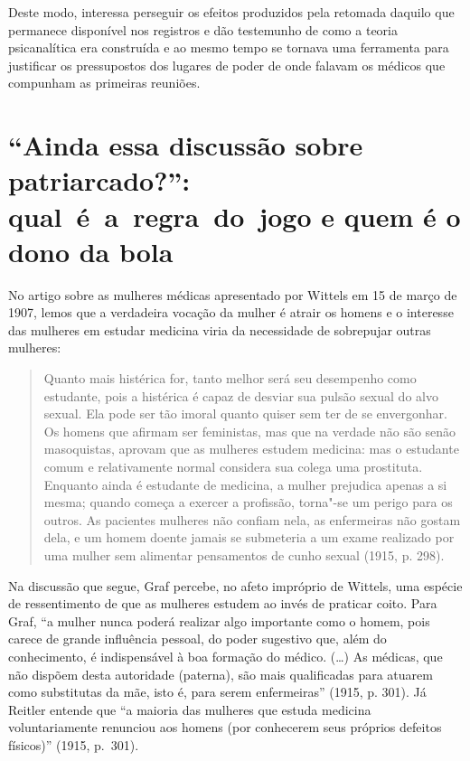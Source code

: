 Deste modo, interessa perseguir os efeitos produzidos pela retomada
daquilo que permanece disponível nos registros e dão testemunho de como
a teoria psicanalítica era construída e ao mesmo tempo se tornava uma
ferramenta para justificar os pressupostos dos lugares de poder de onde
falavam os médicos que compunham as primeiras reuniões.

\section{``Ainda essa discussão sobre patriarcado?'': qual~é~a~regra~do~jogo
e quem é o dono da bola}

No artigo sobre as mulheres médicas apresentado por Wittels em 15 de
março de 1907, lemos que a verdadeira vocação da mulher é atrair os
homens e o interesse das mulheres em estudar medicina viria da
necessidade de sobrepujar outras mulheres:

\begin{quote}
Quanto mais histérica for, tanto melhor será seu desempenho
como estudante, pois a histérica é capaz de desviar sua pulsão sexual do
alvo sexual. Ela pode ser tão imoral quanto quiser sem ter de se
envergonhar. Os homens que afirmam ser feministas, mas que na verdade
não são senão masoquistas, aprovam que as mulheres estudem medicina: mas
o estudante comum e relativamente normal considera sua colega uma
prostituta. Enquanto ainda é estudante de medicina, a mulher prejudica
apenas a si mesma; quando começa a exercer a profissão, torna"-se um
perigo para os outros. As pacientes mulheres não confiam nela, as
enfermeiras não gostam dela, e um homem doente jamais se submeteria a um
exame realizado por uma mulher sem alimentar pensamentos de cunho
sexual (1915, p. 298).
\end{quote}

Na discussão que segue, Graf percebe, no afeto impróprio de Wittels, uma
espécie de ressentimento de que as mulheres estudem ao invés de praticar
coito. Para Graf, ``a mulher nunca poderá realizar algo importante como
o homem, pois carece de grande influência pessoal, do poder sugestivo
que, além do conhecimento, é indispensável à boa formação do médico.
(\ldots{}) As médicas, que não dispõem desta autoridade (paterna), são mais
qualificadas para atuarem como substitutas da mãe, isto é, para serem
enfermeiras'' (1915, p. 301). Já Reitler entende que ``a maioria das
mulheres que estuda medicina voluntariamente renunciou aos homens (por
conhecerem seus próprios defeitos físicos)'' (1915, p.~301).

